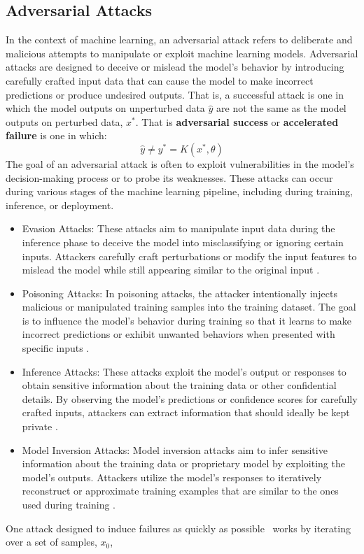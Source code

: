\documentclass[conference]{IEEEtran}
\begin{document}
\subsection{Adversarial Attacks}

In the context of machine learning, an adversarial attack refers to deliberate and malicious attempts to manipulate or exploit machine learning models. Adversarial attacks are designed to deceive or mislead the model's behavior by introducing carefully crafted input data that can cause the model to make incorrect predictions or produce undesired outputs. That is, a successful attack is one in which the model outputs on unperturbed data $\hat{y}$ are not the same as the model outputs on perturbed data, $x^*$. That is \textbf{adversarial success} or \textbf{accelerated failure} is one in which:
\begin{equation}
\hat{y} \neq y^* = K(x^*, \theta)
\label{eq:adv_success}
\end{equation}
The goal of an adversarial attack is often to exploit vulnerabilities in the model's decision-making process or to probe its weaknesses. These attacks can occur during various stages of the machine learning pipeline, including during training, inference, or deployment. 

\begin{itemize}
    \item Evasion Attacks: These attacks aim to manipulate input data during the inference phase to deceive the model into misclassifying or ignoring certain inputs. Attackers carefully craft perturbations or modify the input features to mislead the model while still appearing similar to the original input \cite{biggio_evasion_2013, carlini_towards_2017, adversarialpatch, pixelattack, hopskipjump}.
    \item Poisoning Attacks: In poisoning attacks, the attacker intentionally injects malicious or manipulated training samples into the training dataset. The goal is to influence the model's behavior during training so that it learns to make incorrect predictions or exhibit unwanted behaviors when presented with specific inputs \cite{biggio_poisoning_2013, saha2020hidden}.
    \item Inference Attacks: These attacks exploit the model's output or responses to obtain sensitive information about the training data or other confidential details. By observing the model's predictions or confidence scores for carefully crafted inputs, attackers can extract information that should ideally be kept private \cite{chakraborty_adversarial_2018, orekondy2019knockoff}.
    \item Model Inversion Attacks: Model inversion attacks aim to infer sensitive information about the training data or proprietary model by exploiting the model's outputs. Attackers utilize the model's responses to iteratively reconstruct or approximate training examples that are similar to the ones used during training \cite{chakraborty_adversarial_2018, choquette2021label, li2021membership}.
\end{itemize}
One attack designed to induce failures as quickly as possible~\cite{fgm,meyers_aft} works by iterating over a set of samples, $x_0$,
\end{document}
